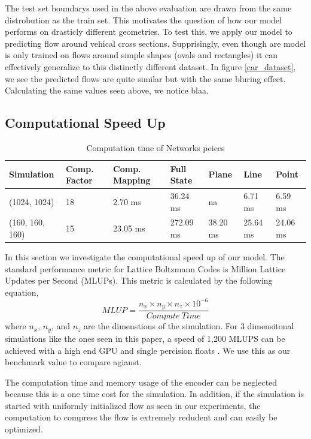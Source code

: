 \documentclass{article}
\begin{document}
The test set boundarys used in the above evaluation are drawn from the same distrobution as the train set. This motivates the question of how our model performs on drasticly different geometries. To test this, we apply our model to predicting flow around vehical cross sections. Supprisingly, even though are model is only trained on flows around simple shapes (ovals and rectangles) it can effectively generalize to this distinctly different dataset. In figure \ref{car_dataset}, we see the predicted flows are quite similar but with the same bluring effect. Calculating the same values seen above, we notice blaa.



\subsection{Computational Speed Up}

\begin{table}[]
\small
\caption{Computation time of Networks peices} \label{compute_times}
\centering
\begin{tabular}{|l|llllll|}
\hline
Simulation    & Comp. Factor       & Comp. Mapping       & Full State  & Plane      & Line       & Point \\ \hline
(1024, 1024)  & 18                 & 2.70 ms            & 36.24 ms   & na         & 6.71 ms   & 6.59 ms \\
(160, 160, 160) & 15                 & 23.05 ms           & 272.09 ms  & 38.20 ms  & 25.64 ms  & 24.06 ms  
\\ \hline
\end{tabular}
\label{computation_table}
\end{table}


In this section we investigate the computational speed up of our model. The standard performance metric for Lattice Boltzmann Codes is Million Lattice Updates per Second (MLUPs). This metric is calculated by the following equation,
\begin{equation}
  MLUP = \frac{n_x \times n_y \times n_z \times 10^{-6}}{Compute \ Time}
\end{equation}
 where $n_x$, $n_y$, and $n_z$ are the dimenstions of the simulation. For 3 dimensitonal simulations like the ones seen in this paper, a speed of 1,200 MLUPS can be achieved with a high end GPU and single percision floats \cite{januszewski2014sailfish}. We use this as our benchmark value to compare agianst.

The computation time and memory usage of the encoder can be neglected because this is a one time cost for the simulation. In addition, if the simulation is started with uniformly initialized flow as seen in our experiments, the computation to compress the flow is extremely redudent and can easily be optimized.
\end{document}
